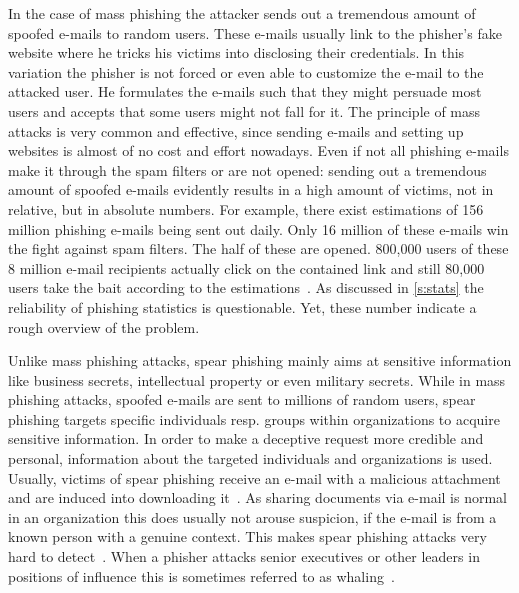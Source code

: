 \begin{description}[leftmargin=0cm]
	\item[Mass Phishing:] In the case of mass phishing the attacker sends out a tremendous amount of spoofed e-mails to random users.
 These e-mails usually link to the phisher's fake website where he tricks his victims into disclosing their credentials.
 In this variation the phisher is not forced or even able to customize the e-mail to the attacked user.
 He formulates the e-mails such that they might persuade most users and accepts that some users might not fall for it.
 The principle of mass attacks is very common and effective, since sending e-mails and setting up websites is almost of no cost and effort nowadays.
 Even if not all phishing e-mails make it through the spam filters or are not opened: sending out a tremendous amount of spoofed e-mails evidently results in a high amount of victims, not in relative, but in absolute numbers.
 For example, there exist estimations of 156 million phishing e-mails being sent out daily.
 Only 16 million of these e-mails win the fight against spam filters.
 The half of these are opened.
 800,000 users of these 8 million e-mail recipients actually click on the contained link and still 80,000 users take the bait according to the estimations~\cite{takethebait}. As discussed in \autoref{s:stats} the reliability of phishing statistics is questionable. Yet, these number indicate a rough overview of the problem.
	\item[Spear Phishing:] Unlike mass phishing attacks, spear phishing mainly aims at sensitive information like business secrets, intellectual property or even military secrets.
 While in mass phishing attacks, spoofed e-mails are sent to millions of random users, spear phishing targets specific individuals resp.
 groups within organizations to acquire sensitive information.
 In order to make a deceptive request more credible and personal, information about the targeted individuals and organizations is used.
 Usually, victims of spear phishing receive an e-mail with a malicious attachment and are induced into downloading it~\cite{trendlabs2012spear}.
 As sharing documents via e-mail is normal in an organization this does usually not arouse suspicion, if the e-mail is from a known person with a genuine context.
 This makes spear phishing attacks very hard to detect~\cite{trendlabs2012spear,statephishinghong}.
When a phisher attacks senior executives or other leaders in positions of influence this is sometimes referred to as whaling~\cite{whaling}.
\end{description}

